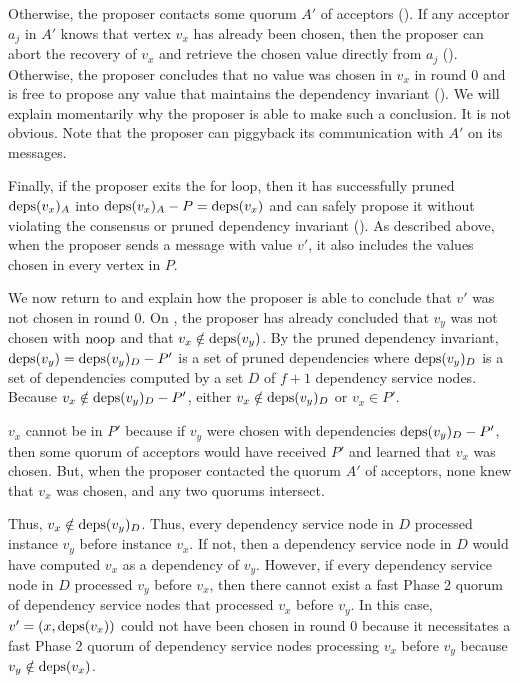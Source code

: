 Otherwise, the proposer contacts some quorum $A'$ of acceptors
(). If any acceptor $a_j$ in $A'$ knows that vertex
$v_x$ has already been chosen, then the proposer can abort the recovery of
$v_x$ and retrieve the chosen value directly from $a_j$
(). Otherwise, the proposer concludes that no value
was chosen in $v_x$ in round $0$ and is free to propose any value that
maintains the dependency invariant (). We will
explain momentarily why the proposer is able to make such a conclusion. It is
not obvious. Note that the proposer can piggyback its communication with $A'$
on its  messages.

Finally, if the proposer exits the for loop, then it has successfully pruned
$\text{deps}(v_x)_A$ into $\text{deps}(v_x)_A - P = \text{deps}(v_x)$ and can safely propose it
without violating the consensus or pruned dependency invariant
().  As described above, when the proposer sends
a  message with value $v'$, it also includes the values chosen
in every vertex in $P$.

We now return to  and explain how the proposer is
able to conclude that $v'$ was not chosen in round $0$. On
, the proposer has already concluded that $v_y$ was
not chosen with $\text{noop}$ and that $v_x \notin \text{deps}(v_y)$. By the pruned
dependency invariant, $\text{deps}(v_y) = \text{deps}(v_y)_{D} - P'$ is a set of pruned
dependencies where $\text{deps}(v_y)_{D}$ is a set of dependencies computed by a set
$D$ of $f+1$ dependency service nodes. Because $v_x \notin \text{deps}(v_y)_{D} -
P'$, either $v_x \notin \text{deps}(v_y)_{D}$ or $v_x \in P'$.

$v_x$ cannot be in $P'$ because if $v_y$ were chosen with dependencies
$\text{deps}(v_y)_{D} - P'$, then some quorum of acceptors would have received $P'$
and learned that $v_x$ was chosen. But, when the proposer contacted the quorum
$A'$ of acceptors, none knew that $v_x$ was chosen, and any two quorums
intersect.

Thus, $v_x \notin \text{deps}(v_y)_{D}$. Thus, every dependency service node in $D$
processed instance $v_y$ before instance $v_x$. If not, then a dependency
service node in $D$ would have computed $v_x$ as a dependency of $v_y$.
However, if every dependency service node in $D$ processed $v_y$ before $v_x$,
then there cannot exist a fast Phase 2 quorum of dependency service nodes that
processed $v_x$ before $v_y$. In this case, $v' = (x, \text{deps}(v_x))$ could not
have been chosen in round $0$ because it necessitates a fast Phase 2 quorum of
dependency service nodes processing $v_x$ before $v_y$ because $v_y \notin
\text{deps}(v_x)$.

